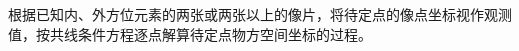 \documentclass[a4paper]{ctexart}
\begin{document}
根据已知内、外方位元素的两张或两张以上的像片，将待定点的像点坐标视作观测值，按共线条件方程逐点解算待定点物方空间坐标的过程。
\begin{figure}[htbp]
\centering

%
%
\centering
\end{figure}
\end{document}
